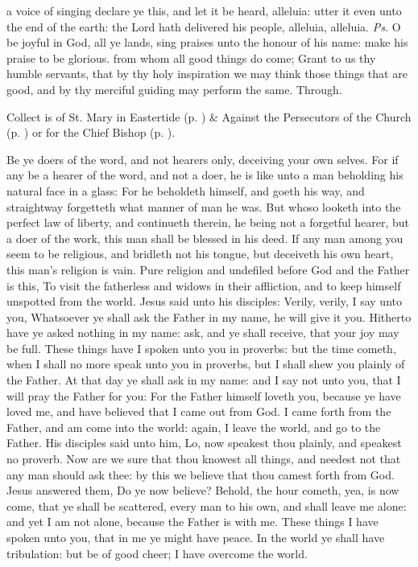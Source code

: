 \introit
{} a voice of singing declare ye this, and let it be heard, alleluia: utter it even unto the end of the earth: the Lord hath delivered his people, alleluia, alleluia. \textit{Ps.} O be joyful in God, all ye lands, sing praises unto the honour of his name: make his praise to be glorious.
\collect
{} from whom all good things do come; Grant to us thy humble servants, that by thy holy inspiration we may think those things that are good, and by thy merciful guiding may perform the same. Through.
\begin{rubric}
     Collect is of St. Mary in Eastertide (p. \pageref{SPMaryInEaster}) \&  Against the Persecutors of the Church (p. \pageref{SPAgainst}) or for the Chief Bishop (p. \pageref{SPChiefBishop}).
\end{rubric}
 Be ye doers of the word, and not hearers only, deceiving your own selves. For if any be a hearer of the word, and not a doer, he is like unto a man beholding his natural face in a glass: For he beholdeth himself, and goeth his way, and straightway forgetteth what manner of man he was. But whoso looketh into the perfect law of liberty, and continueth therein, he being not a forgetful hearer, but a doer of the work, this man shall be blessed in his deed. If any man among you seem to be religious, and bridleth not his tongue, but deceiveth his own heart, this man's religion is vain. Pure religion and undefiled before God and the Father is this, To visit the fatherless and widows in their affliction, and to keep himself unspotted from the world.
 Jesus said unto his disciples: Verily, verily, I say unto you, Whatsoever ye shall ask the Father in my name, he will give it you. Hitherto have ye asked nothing in my name: ask, and ye shall receive, that your joy may be full. These things have I spoken unto you in proverbs: but the time cometh, when I shall no more speak unto you in proverbs, but I shall shew you plainly of the Father. At that day ye shall ask in my name: and I say not unto you, that I will pray the Father for you: For the Father himself loveth you, because ye have loved me, and have believed that I came out from God. I came forth from the Father, and am come into the world: again, I leave the world, and go to the Father. His disciples said unto him, Lo, now speakest thou plainly, and speakest no proverb. Now are we sure that thou knowest all things, and needest not that any man should ask thee: by this we believe that thou camest forth from God. Jesus answered them, Do ye now believe? Behold, the hour cometh, yea, is now come, that ye shall be scattered, every man to his own, and shall leave me alone: and yet I am not alone, because the Father is with me. These things I have spoken unto you, that in me ye might have peace. In the world ye shall have tribulation: but be of good cheer; I have overcome the world.

